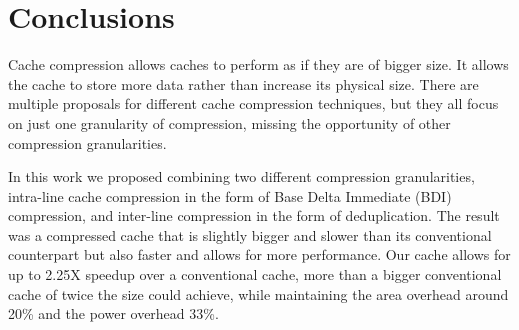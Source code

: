
\chapter{Conclusions}
\label{Conclusions}

Cache compression allows caches to perform as if they are of bigger size. It allows the cache to store more data rather than increase its physical size. There are multiple proposals for different cache compression techniques, but they all focus on just one granularity of compression, missing the opportunity of other compression granularities.\par
In this work we proposed combining two different compression granularities, intra-line cache compression in the form of Base Delta Immediate (BDI) compression, and inter-line compression in the form of deduplication. The result was a compressed cache that is slightly bigger and slower than its conventional counterpart but also faster and allows for more performance. Our cache allows for up to 2.25X speedup over a conventional cache, more than a bigger conventional cache of twice the size could achieve, while maintaining the area overhead around 20\% and the power overhead 33\%.\par